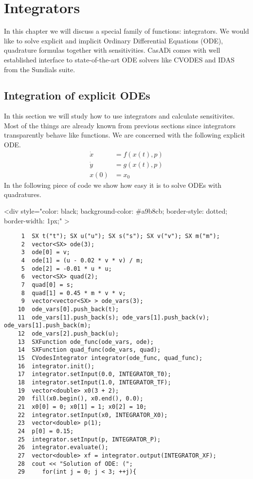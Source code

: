 \documentclass[a4paper,12pt]{book}
\newcommand{\codebegin}{
\begin{rawhtml}
<div style="color: black; background-color: \#a9b8cb;  border-style: dotted; border-width: 1px;" >
\end{rawhtml}
}
\newcommand{\codebegin}{

}
\begin{document}
{\chapter{Integrators \label{chapter:integrators}}
In this chapter we will discuss a special family of functions: integrators. We would like to solve explicit and implicit 
Ordinary Differential Equations (ODE), quadrature formulas together with sensitivities. CasADi comes with well established
interface to state-of-the-art ODE solvers like CVODES and IDAS from the Sundials suite.
\section{Integration of explicit ODEs}
In this section we will study how to use integrators and calculate sensitivites. Most of the things are already known from previous sections
since integrators transparently behave like functions. We are concerned with the following explicit ODE.
\begin{align}
\dot{x} &= f(x(t), p)\\
\dot{y} &= g(x(t), p)\\
x(0) &= x_0
\end{align}
In the following piece of code we show how easy it is to solve ODEs with quadratures.
\par
\codebegin
\begin{verbatim}
     1  SX t("t"); SX u("u"); SX s("s"); SX v("v"); SX m("m");
     2  vector<SX> ode(3);
     3  ode[0] = v;
     4  ode[1] = (u - 0.02 * v * v) / m;
     5  ode[2] = -0.01 * u * u;
     6  vector<SX> quad(2);
     7  quad[0] = s;
     8  quad[1] = 0.45 * m * v * v;
     9  vector<vector<SX> > ode_vars(3);
    10  ode_vars[0].push_back(t);
    11  ode_vars[1].push_back(s); ode_vars[1].push_back(v); ode_vars[1].push_back(m);
    12  ode_vars[2].push_back(u);
    13  SXFunction ode_func(ode_vars, ode);
    14  SXFunction quad_func(ode_vars, quad);
    15  CVodesIntegrator integrator(ode_func, quad_func);
    16  integrator.init();
    17  integrator.setInput(0.0, INTEGRATOR_T0);
    18  integrator.setInput(1.0, INTEGRATOR_TF);
    19  vector<double> x0(3 + 2);
    20  fill(x0.begin(), x0.end(), 0.0);
    21  x0[0] = 0; x0[1] = 1; x0[2] = 10;
    22  integrator.setInput(x0, INTEGRATOR_X0);
    23  vector<double> p(1);
    24  p[0] = 0.15;
    25  integrator.setInput(p, INTEGRATOR_P);
    26  integrator.evaluate();
    27  vector<double> xf = integrator.output(INTEGRATOR_XF);
    28  cout << "Solution of ODE: (";
    29     for(int j = 0; j < 3; ++j){

\end{verbatim}}
\end{document}
